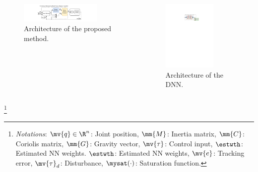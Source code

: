 \documentclass[8pt, aspectratio=169, handout]{beamer}
\begin{document}
\begin{frame}{\insertsubsectionhead}
\begin{columns}

      \begin{figure}
        \includegraphics[width=0.8\textwidth]{figures/Controller.drawio.pdf}
        \caption{Architecture of the proposed method.}
      \end{figure}

      \begin{figure}
        \includegraphics[width=0.7\textwidth]{figures/DNN.drawio.pdf}
        \caption{Architecture of the DNN.}
      \end{figure}

  \end{columns}

    \let\thefootnote\relax\footnote{
      \textit{Notations}: 
        $\mv{q}\in\R^n$: Joint position, $\mm{M}$: Inertia matrix, $\mm{C}$: Coriolis matrix, $\mm{G}$: Gravity vector, $\mv{\tau}$: Control input, $\estwth$: Estimated NN weights.
        $\estwth$: Estimated NN weights, $\mv{e}$: Tracking error, $\mv{\tau}_d$: Disturbance, $\mysat(\cdot)$: Saturation function.
      }

\end{frame}
\end{document}
